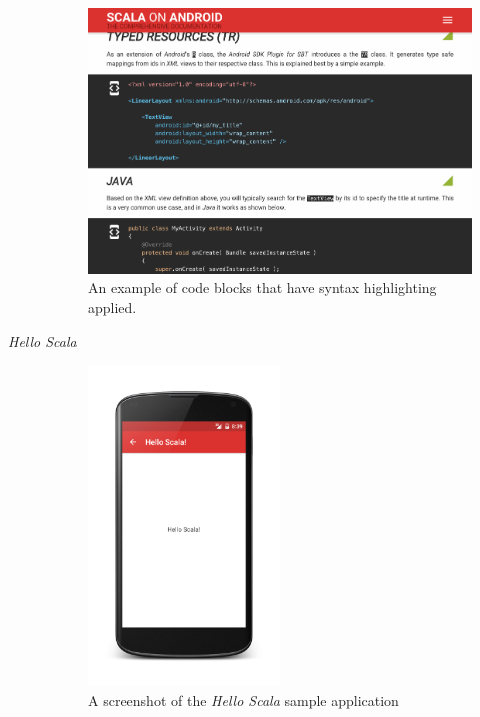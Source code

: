 \begin{description}
	\begin{figure}[H]
		\includegraphics[width=\textwidth]{asset/syntax-highlighting.png}
		\caption{An example of code blocks that have syntax highlighting applied.}
		\label{syntax-highlighting}
	\end{figure}

	\newpage

	\item[\textit{Hello Scala}]\hfill

	\begin{figure}[H]
		\center
		\includegraphics[width=0.5\textwidth]{asset/hello-scala.png}
		\caption{A screenshot of the \textit{Hello Scala} sample application}
		\label{hello-scala}
	\end{figure}


\end{description}

